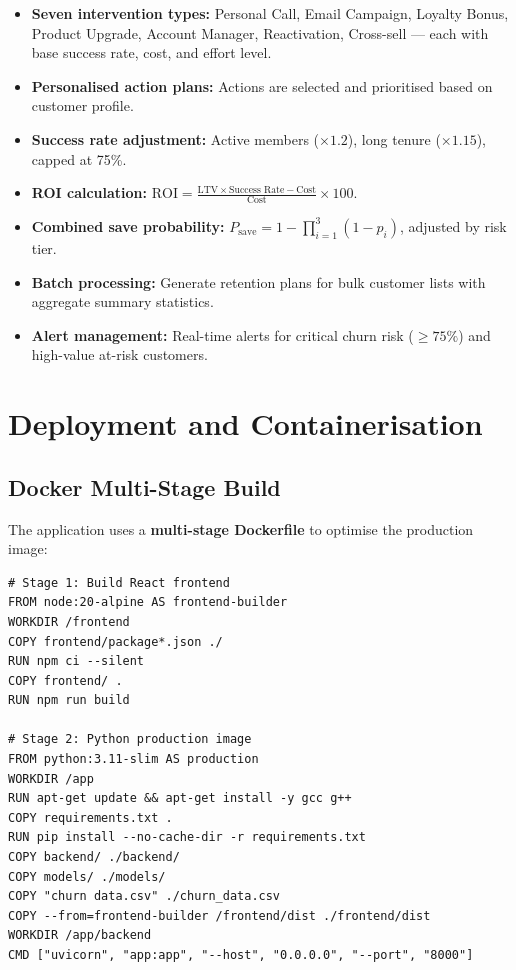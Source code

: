 \documentclass[12pt, a4paper]{report}
\begin{document}
\begin{itemize}
    \item \textbf{Seven intervention types:} Personal Call, Email Campaign, Loyalty Bonus, Product Upgrade, Account Manager, Reactivation, Cross-sell --- each with base success rate, cost, and effort level.
    \item \textbf{Personalised action plans:} Actions are selected and prioritised based on customer profile.
    \item \textbf{Success rate adjustment:} Active members ($\times 1.2$), long tenure ($\times 1.15$), capped at 75\%.
    \item \textbf{ROI calculation:} $\text{ROI} = \frac{\text{LTV} \times \text{Success Rate} - \text{Cost}}{\text{Cost}} \times 100$.
    \item \textbf{Combined save probability:} $P_{\text{save}} = 1 - \prod_{i=1}^{3}(1 - p_i)$, adjusted by risk tier.
    \item \textbf{Batch processing:} Generate retention plans for bulk customer lists with aggregate summary statistics.
    \item \textbf{Alert management:} Real-time alerts for critical churn risk ($\geq 75\%$) and high-value at-risk customers.
\end{itemize}


\chapter{Deployment and Containerisation}

\section{Docker Multi-Stage Build}

The application uses a \textbf{multi-stage Dockerfile} to optimise the production image:

\begin{lstlisting}[language={}, caption={Dockerfile Overview}]
# Stage 1: Build React frontend
FROM node:20-alpine AS frontend-builder
WORKDIR /frontend
COPY frontend/package*.json ./
RUN npm ci --silent
COPY frontend/ .
RUN npm run build

# Stage 2: Python production image
FROM python:3.11-slim AS production
WORKDIR /app
RUN apt-get update && apt-get install -y gcc g++
COPY requirements.txt .
RUN pip install --no-cache-dir -r requirements.txt
COPY backend/ ./backend/
COPY models/ ./models/
COPY "churn data.csv" ./churn_data.csv
COPY --from=frontend-builder /frontend/dist ./frontend/dist
WORKDIR /app/backend
CMD ["uvicorn", "app:app", "--host", "0.0.0.0", "--port", "8000"]
\end{lstlisting}
\end{document}

